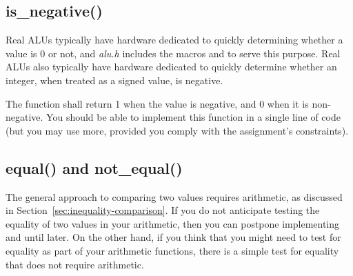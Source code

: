 \begin{description}
\end{description}


\vspace{1cm}

\begin{description}
\end{description}


\subsection{is\_negative()} \label{subsec:negative}

Real ALUs typically have hardware dedicated to quickly determining whether a value is 0 or not, and \textit{alu.h} includes the macros  and  to serve this purpose.
Real ALUs also typically have hardware dedicated to quickly determine whether an integer, when treated as a signed value, is negative.

\begin{description}
\end{description}
The function shall return 1 when the value is negative, and 0 when it is non-negative.
You should be able to implement this function in a single line of code (but you may use more, provided you comply with the assignment's constraints).


\subsection{equal() and not\_equal()}

The general approach to comparing two values requires arithmetic, as discussed in Section~\ref{sec:inequality-comparison}.
If you do not anticipate testing the equality of two values in your arithmetic, then you can postpone implementing  and  until later.
On the other hand, if you think that you might need to test for equality as part of your arithmetic functions, there is a simple test for equality that does not require arithmetic.

